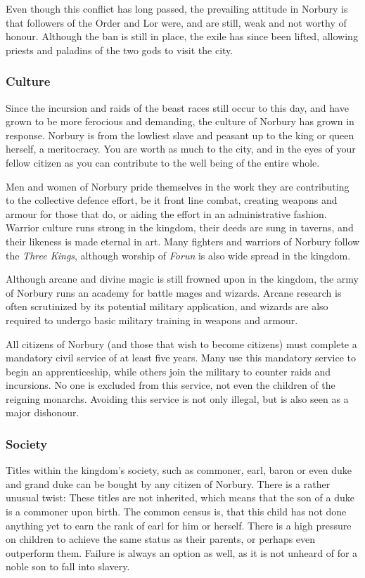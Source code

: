 Even though this conflict has long passed, the prevailing attitude in Norbury is
that followers of the Order and Lor were, and are still, weak and not worthy
of honour. Although the ban is still in place, the exile has since been
lifted, allowing priests and paladins of the two gods to visit the city.

\subsubsection{Culture}

Since the incursion and raids of the beast races still occur to this day, and
have grown to be more ferocious and demanding, the culture of Norbury has
grown in response. Norbury is from the lowliest slave and peasant up to the
king or queen herself, a meritocracy. You are worth as much to the city, and
in the eyes of your fellow citizen as you can contribute to the well being of
the entire whole.

Men and women of Norbury pride themselves in the work they are contributing to
the collective defence effort, be it front line combat, creating weapons and
armour for those that do, or aiding the effort in an administrative
fashion. Warrior culture runs strong in the kingdom, their deeds are sung in
taverns, and their likeness is made eternal in art. Many fighters and warriors
of Norbury follow the \emph{Three Kings}, although worship of \emph{Forun} is
also wide spread in the kingdom.

Although arcane and divine magic is still frowned upon in the kingdom, the army
of Norbury runs an academy for battle mages and wizards. Arcane research is
often scrutinized by its potential military application, and wizards are also
required to undergo basic military training in weapons and armour.

All citizens of Norbury (and those that wish to become citizens) must complete
a mandatory civil service of at least five years. Many use this mandatory
service to begin an apprenticeship, while others join the military to counter
raids and incursions. No one is excluded from this service, not even the
children of the reigning monarchs. Avoiding this service is not only illegal,
but is also seen as a major dishonour.

\subsubsection{Society}

Titles within the kingdom's society, such as commoner, earl, baron or even
duke and grand duke can be bought by any citizen of Norbury. There is a rather
unusual twist: These titles are not inherited, which means that the son of a
duke is a commoner upon birth. The common census is, that this child has not
done anything yet to earn the rank of earl for him or herself. There is a high
pressure on children to achieve the same status as their parents, or perhaps
even outperform them. Failure is always an option as well, as it is not
unheard of for a noble son to fall into slavery.

